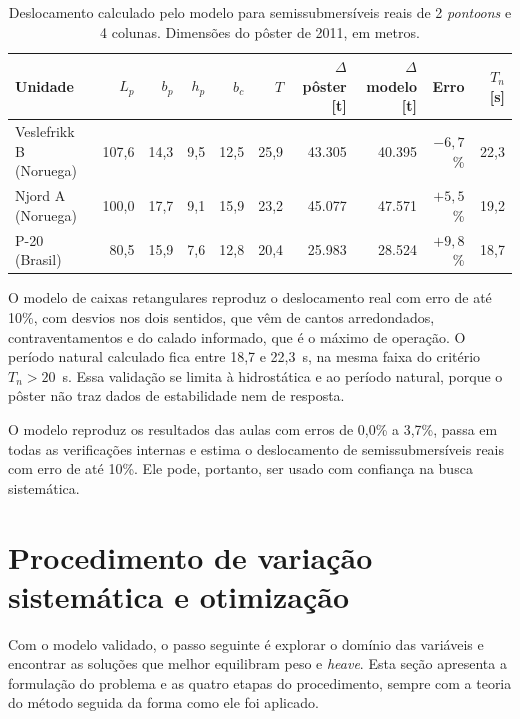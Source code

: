 \documentclass[11pt,a4paper]{article}
\begin{document}
\begin{table}[!htb]
\centering
\caption[Validação do deslocamento com semissubmersíveis reais]{Deslocamento calculado pelo modelo
para semissubmersíveis reais de 2 \emph{pontoons} e 4 colunas. Dimensões do pôster de 2011, em
metros.}\label{tab:valposter}
\small\setlength{\tabcolsep}{4.5pt}
\begin{tabular}{lrrrrrrrrr}
\toprule
Unidade & $L_p$ & $b_p$ & $h_p$ & $b_c$ & $T$ & $\Delta$ pôster [t] & $\Delta$ modelo [t] & Erro & $T_n$ [s] \\
\midrule
Veslefrikk B (Noruega) & 107,6 & 14,3 & 9,5 & 12,5 & 25,9 & 43.305 & 40.395 & $-6{,}7$\% & 22,3 \\
Njord A (Noruega) & 100,0 & 17,7 & 9,1 & 15,9 & 23,2 & 45.077 & 47.571 & $+5{,}5$\% & 19,2 \\
P-20 (Brasil) & 80,5 & 15,9 & 7,6 & 12,8 & 20,4 & 25.983 & 28.524 & $+9{,}8$\% & 18,7 \\
\bottomrule
\end{tabular}
\end{table}

O modelo de caixas retangulares reproduz o deslocamento real com erro de até 10\%, com desvios
nos dois sentidos, que vêm de cantos arredondados, contraventamentos e do calado informado, que é o
máximo de operação. O período natural calculado fica entre 18,7 e 22,3~s, na mesma faixa do
critério $T_n > 20$~s. Essa validação se limita à hidrostática e ao período natural, porque o
pôster não traz dados de estabilidade nem de resposta.

\begin{sintese}
O modelo reproduz os resultados das aulas com erros de 0,0\% a 3,7\%, passa em todas as
verificações internas e estima o deslocamento de semissubmersíveis reais com erro de até 10\%. Ele
pode, portanto, ser usado com confiança na busca sistemática.
\end{sintese}

\section{Procedimento de variação sistemática e otimização}\label{sec:procedimento}

Com o modelo validado, o passo seguinte é explorar o domínio das variáveis e encontrar as
soluções que melhor equilibram peso e \emph{heave}. Esta seção apresenta a formulação do problema
e as quatro etapas do procedimento, sempre com a teoria do método seguida da forma como ele foi
aplicado.
\end{document}
